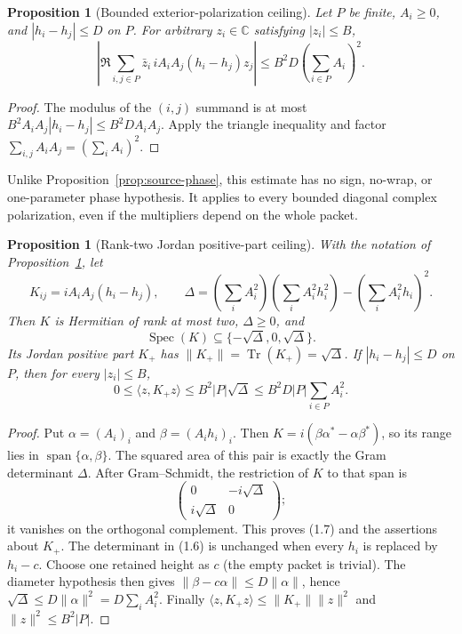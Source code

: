 \documentclass[11pt]{article}
\newtheorem{proposition}[theorem]{Proposition}
\theoremstyle{definition}
\theoremstyle{remark}
\newcommand{\C}{\mathbb C}
\begin{document}
\begin{proposition}[Bounded exterior-polarization ceiling]\label{prop:exterior-ceiling}
Let $P$ be finite, $A_i\geq0$, and
$|h_i-h_j|\leq D$ on $P$.  For arbitrary $z_i\in\C$ satisfying $|z_i|\leq B$,
\[
 \left|\Re\sum_{i,j\in P}
   \bar z_i\,iA_iA_j(h_i-h_j)z_j\right|
 \leq B^2D\left(\sum_{i\in P}A_i\right)^2.
 \tag{1.5}
\]
\end{proposition}

\begin{proof}
The modulus of the $(i,j)$ summand is at most
$B^2A_iA_j|h_i-h_j|\leq B^2DA_iA_j$.  Apply the triangle inequality and factor
$\sum_{i,j}A_iA_j=(\sum_iA_i)^2$.
\end{proof}

Unlike Proposition~\ref{prop:source-phase}, this estimate has no sign, no-wrap, or one-parameter
phase hypothesis.  It applies to every bounded diagonal complex polarization, even if the
multipliers depend on the whole packet.

\begin{proposition}[Rank-two Jordan positive-part ceiling]\label{prop:exterior-positive-part}
With the notation of Proposition~\ref{prop:exterior-ceiling}, let
\[
 K_{ij}=iA_iA_j(h_i-h_j),\qquad
 \Delta=
 \left(\sum_iA_i^2\right)\left(\sum_iA_i^2h_i^2\right)
 -\left(\sum_iA_i^2h_i\right)^2.
 \tag{1.6}
\]
Then $K$ is Hermitian of rank at most two, $\Delta\geq0$, and
\[
 \operatorname{Spec}(K)\subseteq\{-\sqrt\Delta,0,\sqrt\Delta\}.
 \tag{1.7}
\]
Its Jordan positive part $K_+$ has
$\|K_+\|=\operatorname{Tr}(K_+)=\sqrt\Delta$.  If
$|h_i-h_j|\leq D$ on $P$, then for every $|z_i|\leq B$,
\[
 0\leq\langle z,K_+z\rangle
 \leq B^2|P|\sqrt\Delta
 \leq B^2D|P|\sum_{i\in P}A_i^2.
 \tag{1.8}
\]
\end{proposition}

\begin{proof}
Put $\alpha=(A_i)_i$ and $\beta=(A_ih_i)_i$.  Then
$K=i(\beta\alpha^*-\alpha\beta^*)$, so its range lies in
$\operatorname{span}\{\alpha,\beta\}$.  The squared area of this pair is exactly the Gram
determinant $\Delta$.  After Gram--Schmidt, the restriction of $K$ to that span is
\[
 \begin{pmatrix}0&-i\sqrt\Delta\\ i\sqrt\Delta&0\end{pmatrix};
\]
it vanishes on the orthogonal complement.  This proves (1.7) and the assertions about $K_+$.
The determinant in (1.6) is unchanged when every $h_i$ is replaced by $h_i-c$.  Choose one
retained height as $c$ (the empty packet is trivial).  The diameter hypothesis then gives
$\|\beta-c\alpha\|\leq D\|\alpha\|$, hence
$\sqrt\Delta\leq D\|\alpha\|^2=D\sum_iA_i^2$.  Finally
$\langle z,K_+z\rangle\leq\|K_+\|\|z\|^2$ and
$\|z\|^2\leq B^2|P|$.
\end{proof}
\end{document}
